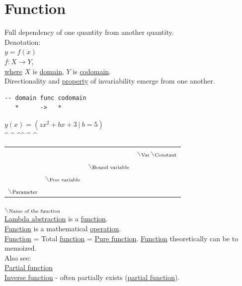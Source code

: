 \documentclass[a4paper,14pt,oneside]{book}
\begin{document}
\chapter{\label{org8cc2ae4}Function}
\label{sec:org5ebd703}
Full dependency of one quantity from another quantity.\\

Denotation:\\
\(y = f(x)\)\\
\(f: X \to Y\),\\
\hyperref[orgd3dc8e4]{where} \(X\) is \hyperref[orgeb6ec49]{domain}, \(Y\) is \hyperref[org71c95ef]{codomain}.\\

Directionality and \hyperref[org91a1c9f]{property} of invariability emerge from one another.\\
\begin{verbatim}
-- domain func codomain
   *      ->   *
\end{verbatim}

\(y(x) = (zx^{2} + bx + 3 \ | \ b = 5)\)\\
\^{} \^{}    \^{}\^{}    \^{}   \^{}\\
\begin{center}
\begin{tabular}{llll}
 &  &  & $\backslash$\(\textsubscript{Var}\)$\backslash$\(\textsubscript{Constant}\)\\
 &  & $\backslash$\(\textsubscript{Bound variable}\)\\
 & $\backslash$\(\textsubscript{Free variable}\)\\
$\backslash$\(\textsubscript{Parameter}\)\\
\end{tabular}
\end{center}
$\backslash$\(\textsubscript{Name of the function}\)\\

\hyperref[org26d502d]{Lambda abstraction} is a \hyperref[org8cc2ae4]{function}.\\
\hyperref[org8cc2ae4]{Function} is a mathematical \hyperref[org6ed0c27]{operation}.\\

\hyperref[org8cc2ae4]{Function} = Total \hyperref[org8cc2ae4]{function} = \hyperref[orgadffffa]{Pure function}. \hyperref[org8cc2ae4]{Function} theoretically can be to memoized.\\

Also see:\\
\hyperref[orgc1ec8cb]{Partial function}\\
\hyperref[org189bf64]{Inverse function} - often partially exists (\hyperref[orgc1ec8cb]{partial function}).\\
\end{document}
